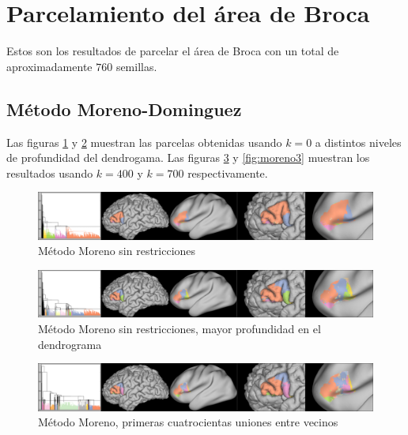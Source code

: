 \section{Parcelamiento del \'area de Broca}

Estos son los resultados de parcelar el \'area de Broca con un total de 
aproximadamente $760$ semillas. 

\subsection{M\'etodo Moreno-Dominguez}

Las figuras \ref{fig:moreno0} y \ref{fig:moreno1} muestran las parcelas obtenidas 
usando $k=0$ a distintos niveles de profundidad del dendrogama. Las figuras 
\ref{fig:moreno2} y \ref{fig:moreno3} muestran los resultados usando $k=400$ y $k=700$
respectivamente.

\begin{figure}[h!]
    \includegraphics[width=\textwidth]{img/broca/moreno_0.png}
    \caption{M\'etodo Moreno sin restricciones}
    \label{fig:moreno0}
\end{figure}
                                                                                                                       
\begin{figure}[h!]
    \includegraphics[width=\textwidth]{img/broca/moreno_0_deep.png}
    \caption{M\'etodo Moreno sin restricciones, mayor profundidad en el 
            dendrograma}
    \label{fig:moreno1}
\end{figure}

\begin{figure}[h!]
    \includegraphics[width=\textwidth]{img/broca/moreno_400.png}
    \caption{M\'etodo Moreno, primeras cuatrocientas uniones entre vecinos}
    \label{fig:moreno2}
\end{figure}

